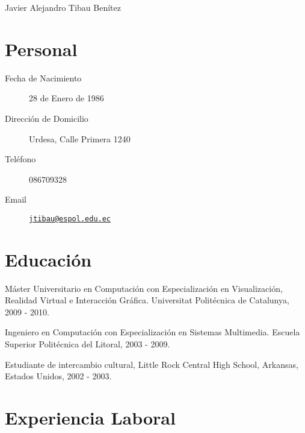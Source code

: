 \documentclass[a4paper]{article}
\def\name{Javier Alejandro Tibau Benítez}
\renewenvironment{itemize}{
  \begin{list}{}{
    \setlength{\leftmargin}{1.5em}
  }
}{
  \end{list}
}
\begin{document}
{\huge \name}


\vspace{0.1in}


\section*{Personal}

\begin{description}
  \item [Fecha de Nacimiento] 28 de Enero de 1986
  \item [Dirección de Domicilio] Urdesa, Calle Primera 1240
  \item [Teléfono] 086709328
  \item [Email] \href{mailto:jtibau@espol.edu.ec}{\tt jtibau@espol.edu.ec}
\end{description}

\section*{Educación}

\begin{itemize}
  \item Máster Universitario en Computación con Especialización en Visualización, Realidad Virtual e Interacción Gráfica. Universitat Politécnica de Catalunya, 2009 - 2010.
  \item Ingeniero en Computación con Especialización en Sistemas Multimedia. Escuela Superior Politécnica del Litoral, 2003 - 2009.
  \item Estudiante de intercambio cultural, Little Rock Central High School, Arkansas, Estados Unidos, 2002 - 2003.
\end{itemize}

\section*{Experiencia Laboral}
\end{document}
